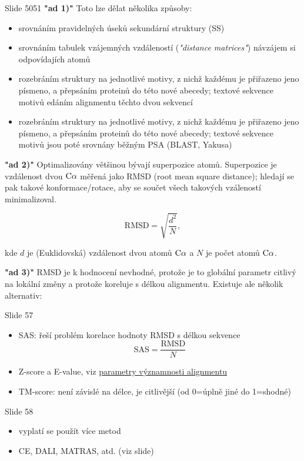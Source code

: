 \documentclass[DIV=8]{scrreprt}
\begin{document}
Slide 5051
\textbf{"ad 1)"} Toto lze dělat několika způsoby:
\begin{itemize}
    \item srovnáním pravidelných úseků sekundární struktury (SS)
    \item srovnáním tabulek vzájemných vzdáleností (\emph{"distance matrices"}) návzájem si odpovídajích atomů
    \item rozebráním struktury na jednotlivé motivy, z nichž každému je přiřazeno jeno písmeno, a přepsáním proteinů do této nové abecedy; textové sekvence motivů edáním alignmentu těchto dvou sekvencí
    \item rozebráním struktury na jednotlivé motivy, z nichž každému je přiřazeno jeno písmeno, a přepsáním proteinů do této nové abecedy; textové sekvence motivů jsou poté srovnány běžným PSA (BLAST, Yakusa)
\end{itemize}


\textbf{"ad 2)"} Optimalizovány většinou bývají superpozice atomů. Superpozice je vzdálenost dvou \(\ce{C\alpha}\) měřená jako RMSD (root mean square distance); hledají se pak takové konformace/rotace, aby se součet všech takových vzáleností minimalizoval.

\[\text{RMSD} = \sqrt{\frac{d^2}{N}},\]

kde \(d\) je (Euklidovská) vzdálenost dvou atomů \(\ce{C\alpha}\) a \(N\) je počet atomů \(\ce{C\alpha}\).

\textbf{"ad 3)"} RMSD je k hodnocení nevhodné, protože je to globální parametr citlivý na lokální změny a protože koreluje s délkou alignmentu. Existuje ale několik alternativ:

Slide 57
\begin{itemize}
    \item SAS: řeší problém korelace hodnoty RMSD s délkou sekvence
  \[\text{SAS} = \frac{\text{RMSD}}{N}\]
    \item Z-score a E-value, viz \href{#Parametry významnosti alignmentu}{para­me­try výz­nam­nos­ti align­men­tu}
    \item TM-score: není závislé na délce, je citlivější (od 0=úplně jiné do 1=shodné)
\end{itemize}


Slide 58
\begin{itemize}
    \item vyplatí se použít více metod
    \item CE, DALI, MATRAS, atd. (viz slide)
\end{itemize}
\end{document}
